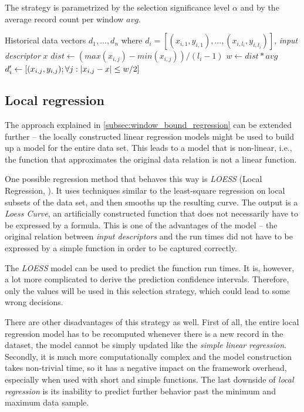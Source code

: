 The strategy is parametrized by the selection significance level $\alpha$ and by the average record count per window $avg$.

\begin{algorithmic}[1] %
	\INPUT Historical data vectors $d_1,...,d_n$ where $d_i = [(x_{i,1}, y_{i,1}),...,(x_{i,l_i}, y_{i,l_i})]$, \textit{input descriptor} $x$
	\State $dist \gets (max(x_{i,j}) - min(x_{i,j})) / (l_i-1)$
	\State $w \gets dist * avg$
	\State $d'_i \gets [(x_{i,j}, y_{i, j}); \forall j: \left|{x_{i,j} - x}\right| \leq w/2]$
	\EndFor
	\State {}
\end{algorithmic}

\subsection{Local regression}
\label{subsec:local_regression}

The approach explained in \ref{subsec:window_bound_regression} can be extended further -- the locally constructed linear regression models might be used to build up a model for the entire data set. This leads to a model that is non-linear, i.e., the function that approximates the original data relation is not a linear function.

One possible regression method that behaves this way is \textit{LOESS} (Local Regression, \cite{cleveland_locally_1988,cleveland_regression_1988,cleveland_computational_1991}). It uses techniques similar to the least-square regression on local subsets of the data set, and then smooths up the resulting curve. The output is a \textit{Loess Curve}, an artificially constructed function that does not necessarily have to be expressed by a formula. This is one of the advantages of the model -- the original relation between \textit{input descriptors} and the run times did not have to be expressed by a simple function in order to be captured correctly.

The \textit{LOESS} model can be used to predict the function run times. It is, however, a lot more complicated to derive the prediction confidence intervals. Therefore, only the values will be used in this selection strategy, which could lead to some wrong decisions.

There are other disadvantages of this strategy as well. First of all, the entire local regression model has to be recomputed whenever there is a new record in the dataset, the model cannot be simply updated like the \textit{simple linear regression}. Secondly, it is much more computationally complex and the model construction takes non-trivial time, so it has a negative impact on the framework overhead, especially when used with short and simple functions. The last downside of \textit{local regression} is its inability to predict further behavior past the minimum and maximum data sample.

